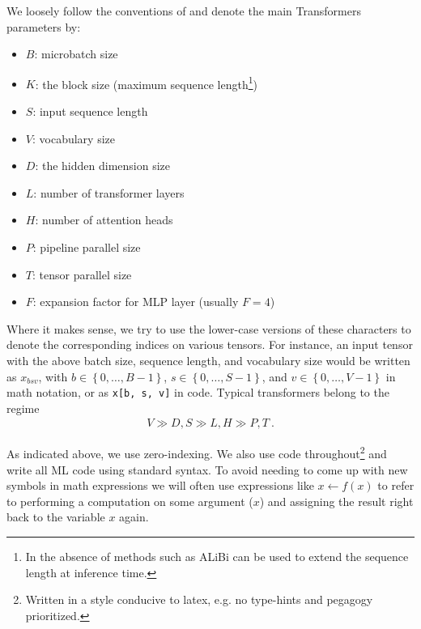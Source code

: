 \documentclass[11pt]{article}
\begin{document}
We loosely follow the conventions of \cite{korthikanti2022reducing} and denote the main Transformers
parameters by:
\begin{itemize}
\item $ B $: microbatch size
\item $ K $: the block size (maximum sequence length\footnote{In the absence of methods such as
    ALiBi \cite{ALiBi}  can be used to extend the sequence length at inference time.})
\item $ S $: input sequence length
\item $ V $: vocabulary size
\item $ D $: the hidden dimension size
\item $ L $: number of transformer layers
\item $ H $: number of attention heads
\item $ P $: pipeline parallel size
\item $ T $: tensor parallel size
\item $ F $: expansion factor for MLP layer (usually $ F=4 $)
\end{itemize}
Where it makes sense, we try to use the lower-case versions of these characters to denote the
corresponding indices on various tensors. For instance, an input tensor with the above batch size,
sequence length, and vocabulary size would be written as $ x _{ bsv } $, with $ b \in \left \{ 0,
\ldots, B - 1 \right \} $, $ s \in \left \{ 0, \ldots, S - 1\right \} $, and $  v \in \left \{ 0,
    \ldots, V -1\right \}$ in math notation, or as \texttt{x[b, s, v]} in code.  Typical
    transformers belong to the regime
\begin{gather}
V \gg D, S \gg L, H \gg P, T \ .  \label{app:eq:transformers_approxs}
\end{gather}


As indicated above,  we use zero-indexing. We also use  code
throughout\footnote{Written in a style conducive to latex, e.g. no type-hints and pegagogy
prioritized.}  and
write all ML code using standard  syntax. To avoid needing to come up with new
symbols in math expressions we will often use expressions like $ x \leftarrow f(x) $ to refer to performing
a computation on some argument ($ x $) and assigning the result right back to the variable $ x $
again.
\end{document}
